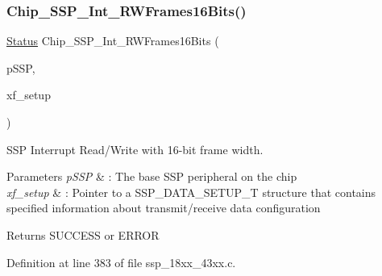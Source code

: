 \subsubsection{\texorpdfstring{Chip\+\_\+\+S\+S\+P\+\_\+\+Int\+\_\+\+R\+W\+Frames16\+Bits()}{Chip\_SSP\_Int\_RWFrames16Bits()}}
{\footnotesize\ttfamily \hyperlink{group___l_p_c___types___public___types_ga67a0db04d321a74b7e7fcfd3f1a3f70b}{Status} Chip\+\_\+\+S\+S\+P\+\_\+\+Int\+\_\+\+R\+W\+Frames16\+Bits (\begin{DoxyParamCaption}\item[{\hyperlink{struct_l_p_c___s_s_p___t}{L\+P\+C\+\_\+\+S\+S\+P\+\_\+T} $\ast$}]{p\+S\+SP,  }\item[{\hyperlink{struct_chip___s_s_p___d_a_t_a___s_e_t_u_p___t}{Chip\+\_\+\+S\+S\+P\+\_\+\+D\+A\+T\+A\+\_\+\+S\+E\+T\+U\+P\+\_\+T} $\ast$}]{xf\+\_\+setup }\end{DoxyParamCaption})}



S\+SP Interrupt Read/\+Write with 16-\/bit frame width. 


\begin{DoxyParams}{Parameters}
{\em p\+S\+SP} & \+: The base S\+SP peripheral on the chip \\
\hline
{\em xf\+\_\+setup} & \+: Pointer to a S\+S\+P\+\_\+\+D\+A\+T\+A\+\_\+\+S\+E\+T\+U\+P\+\_\+T structure that contains specified information about transmit/receive data configuration \\
\hline
\end{DoxyParams}
\begin{DoxyReturn}{Returns}
S\+U\+C\+C\+E\+SS or E\+R\+R\+OR 
\end{DoxyReturn}


Definition at line 383 of file ssp\+\_\+18xx\+\_\+43xx.\+c.

\mbox{\label{group___s_s_p__18_x_x__43_x_x_ga23d901d1757b6d95efc20c4d76721fb3}} 
